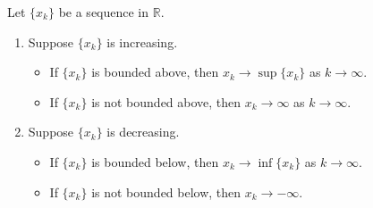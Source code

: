 \documentclass[notoc,notitlepage]{tufte-book}
\begin{document}
\begin{thm}
\label{thm:monotone_convergence_theorem}
  Let $\{x_k\}$ be a sequence in $\mathbb{R}$.
  \begin{enumerate}
    \item Suppose $\{x_k\}$ is increasing.
      \begin{itemize}
        \item If $\{ x_k \}$ is bounded above, then $x_k \to \sup \{ x_k \}$ as $k \to \infty$.
        \item If $\{ x_k \}$ is not bounded above, then $x_k \to \infty$ as $k \to \infty$.
      \end{itemize}
    \item Suppose $\{ x_k \}$ is decreasing.
      \begin{itemize}
        \item If $\{ x_k \}$ is bounded below, then $x_k \to \inf \{ x_k \}$ as $k \to \infty$.
        \item If $\{ x_k \}$ is not bounded below, then $x_k \to -\infty$.
      \end{itemize}
  \end{enumerate}
\end{thm}


\backmatter

\pagestyle{plain}



\printindex
\end{document}
